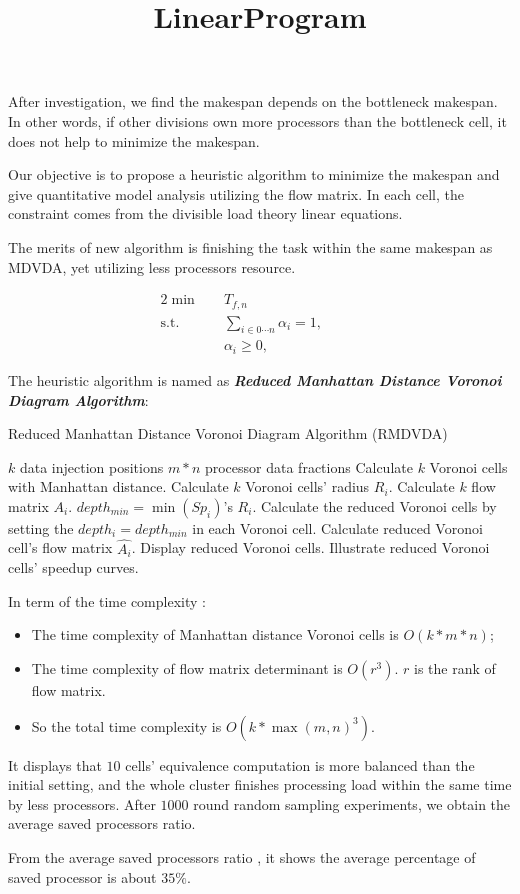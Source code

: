 After investigation, we find the makespan depends on the bottleneck makespan.  In other words, if other divisions own more processors than the bottleneck cell, it does not help to minimize the makespan.  

Our objective is to propose a heuristic algorithm to minimize the makespan and give quantitative model analysis utilizing the flow matrix.  In each cell, the constraint comes from the divisible load theory linear equations.   

The merits of new algorithm is finishing the task within the same makespan as MDVDA, yet utilizing less processors resource.

\title{LinearProgram}
\maketitle
\begin{alignat}{2}
\min\quad & T_{f,n}\\
\mbox{s.t.}\quad
&\sum_{i \in 0 \cdots n} \alpha_{i} = 1, &\quad& \\
&\alpha_{i} \geq 0, &{}& 
\end{alignat}


The heuristic algorithm is named as \textbf{\textit{Reduced Manhattan Distance Voronoi Diagram Algorithm}}:
\begin{algorithm}
\caption{Reduced Manhattan Distance Voronoi Diagram Algorithm (RMDVDA)}
\begin{algorithmic} 
\renewcommand{\algorithmicrequire}{\textbf{Input:}}
\renewcommand{\algorithmicensure}{\textbf{Output:}}
\REQUIRE $k$ data injection positions
\ENSURE $m*n$ processor data fractions
\STATE Calculate $k$ Voronoi cells with Manhattan distance.
\STATE Calculate $k$ Voronoi cells' radius $R_{i}$.
\STATE Calculate $k$ flow matrix $A_{i}$.
\STATE $depth_{min} = \min ({Sp_{i}})$'s $R_{i}$.
\STATE Calculate the reduced Voronoi cells by setting the $depth_{i} = depth_{min}$ in each Voronoi cell.
\STATE Calculate reduced Voronoi cell's flow matrix $\hat{A_{i}}$.
\STATE Display reduced Voronoi cells.
\STATE Illustrate reduced Voronoi cells' speedup curves.
\end{algorithmic}
\end{algorithm}

In term of the time complexity :  
\begin{itemize}
\item The time complexity of Manhattan distance Voronoi cells is $O(k*m*n)$;
\item The time complexity of flow matrix determinant is $O(r^{3})$. $r$ is the rank of flow matrix.
\item So the total time complexity is $O(k*\max (m,n)^{3})$.
\end{itemize}

It displays that $10$ cells' equivalence computation is more balanced than the initial setting, and the whole cluster finishes processing load within the same time by less processors.
After $1000$ round random sampling experiments, we obtain the average saved processors ratio.

From the average saved processors ratio  , it shows the average percentage of saved processor is about $35 \%$.  
